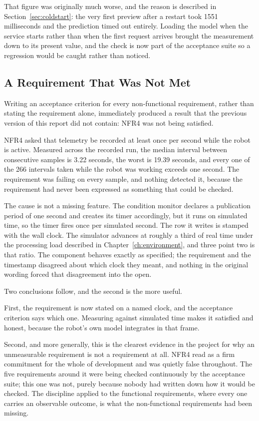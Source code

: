 \documentclass[12pt,a4paper]{report}
\begin{document}
That figure was originally much worse, and the reason is described in
Section~\ref{sec:coldstart}: the very first preview after a restart took 1551 milliseconds and the
prediction timed out entirely. Loading the model when the service starts rather than when the first
request arrives brought the measurement down to its present value, and the check is now part of the
acceptance suite so a regression would be caught rather than noticed.

\subsection{A Requirement That Was Not Met}
\label{sec:nfr4}
Writing an acceptance criterion for every non-functional requirement, rather than stating the
requirement alone, immediately produced a result that the previous version of this report did not
contain: NFR4 was not being satisfied.

NFR4 asked that telemetry be recorded at least once per second while the robot is active. Measured
across the recorded run, the median interval between consecutive samples is 3.22 seconds, the worst
is 19.39 seconds, and every one of the 266 intervals taken while the robot was working exceeds one
second. The requirement was failing on every sample, and nothing detected it, because the
requirement had never been expressed as something that could be checked.

The cause is not a missing feature. The condition monitor declares a publication period of one
second and creates its timer accordingly, but it runs on simulated time, so the timer fires once
per simulated second. The row it writes is stamped with the wall clock. The simulator advances at
roughly a third of real time under the processing load described in
Chapter~\ref{ch:environment}, and three point two is that ratio. The component behaves exactly as
specified; the requirement and the timestamp disagreed about which clock they meant, and nothing in
the original wording forced that disagreement into the open.

Two conclusions follow, and the second is the more useful.

First, the requirement is now stated on a named clock, and the acceptance criterion says which one.
Measuring against simulated time makes it satisfied and honest, because the robot's own model
integrates in that frame.

Second, and more generally, this is the clearest evidence in the project for why an unmeasurable
requirement is not a requirement at all. NFR4 read as a firm commitment for the whole of
development and was quietly false throughout. The five requirements around it were being checked
continuously by the acceptance suite; this one was not, purely because nobody had written down how
it would be checked. The discipline applied to the functional requirements, where every one carries
an observable outcome, is what the non-functional requirements had been missing.
\end{document}
